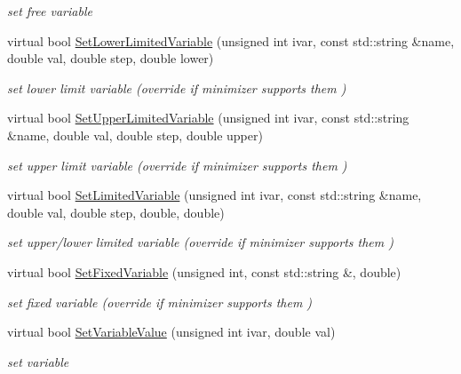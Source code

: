 \begin{DoxyCompactItemize}
\begin{DoxyCompactList}\small\item\em set free variable \end{DoxyCompactList}\item 
virtual bool \mbox{\hyperlink{classROOT_1_1Minuit2_1_1Minuit2Minimizer_af38926946e36f7030cfc1c298ab9b222}{Set\+Lower\+Limited\+Variable}} (unsigned int ivar, const std\+::string \&name, double val, double step, double lower)
\begin{DoxyCompactList}\small\item\em set lower limit variable (override if minimizer supports them ) \end{DoxyCompactList}\item 
virtual bool \mbox{\hyperlink{classROOT_1_1Minuit2_1_1Minuit2Minimizer_a70209b37c419af5d8d1475ce8de29b43}{Set\+Upper\+Limited\+Variable}} (unsigned int ivar, const std\+::string \&name, double val, double step, double upper)
\begin{DoxyCompactList}\small\item\em set upper limit variable (override if minimizer supports them ) \end{DoxyCompactList}\item 
virtual bool \mbox{\hyperlink{classROOT_1_1Minuit2_1_1Minuit2Minimizer_a30385295df6a6b784aa59de7f00e4d23}{Set\+Limited\+Variable}} (unsigned int ivar, const std\+::string \&name, double val, double step, double, double)
\begin{DoxyCompactList}\small\item\em set upper/lower limited variable (override if minimizer supports them ) \end{DoxyCompactList}\item 
virtual bool \mbox{\hyperlink{classROOT_1_1Minuit2_1_1Minuit2Minimizer_af42341b80ebb02d8c0882beaa781e7bd}{Set\+Fixed\+Variable}} (unsigned int, const std\+::string \&, double)
\begin{DoxyCompactList}\small\item\em set fixed variable (override if minimizer supports them ) \end{DoxyCompactList}\item 
virtual bool \mbox{\hyperlink{classROOT_1_1Minuit2_1_1Minuit2Minimizer_a474e05b30c1227e9cc39fb597027f426}{Set\+Variable\+Value}} (unsigned int ivar, double val)
\begin{DoxyCompactList}\small\item\em set variable \end{DoxyCompactList}\item 

\end{DoxyCompactItemize}
